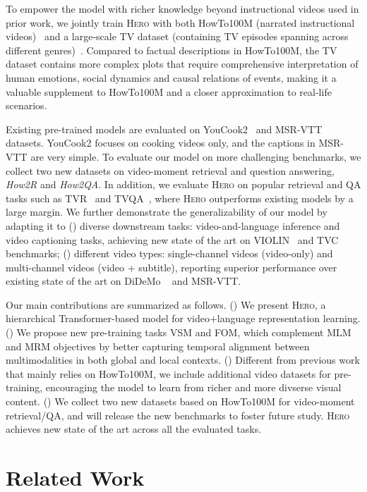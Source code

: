 \documentclass[11pt,a4paper]{article}
\begin{document}
To empower the model with richer knowledge beyond instructional videos used in prior work, we jointly train \textsc{Hero} with both HowTo100M (narrated instructional videos)~\cite{miech2019howto100m} and a large-scale TV dataset (containing TV episodes spanning across different genres)~\cite{lei2018tvqa,lei2019tvqaplus,lei2020tvr,liu2020violin}. Compared to factual descriptions in HowTo100M, the TV dataset contains more complex plots that require comprehensive interpretation of human emotions, social dynamics and causal relations of events, making it a valuable supplement to HowTo100M and a closer approximation to real-life scenarios. 

Existing pre-trained models are evaluated on YouCook2~\citep{zhou2018towards} and MSR-VTT~\citep{xu2016msr} datasets. YouCook2 focuses on cooking videos only, and the captions in MSR-VTT are very simple. To evaluate our model on more challenging benchmarks, we collect two new datasets on video-moment retrieval and question answering, \emph{How2R} and \emph{How2QA}.
In addition, we evaluate \textsc{Hero} on popular retrieval and QA tasks such as TVR~\citep{lei2020tvr} and TVQA~\citep{lei2018tvqa}, where \textsc{Hero} outperforms existing models by a large margin. We further demonstrate the generalizability of our model by adapting it to () diverse downstream tasks: video-and-language inference and video captioning tasks, achieving new state of the art on VIOLIN~\citep{liu2020violin} and  TVC~\citep{lei2020tvr} benchmarks;  () different video types: single-channel videos (video-only) and  multi-channel videos (video + subtitle), reporting superior performance over existing state of the art on DiDeMo ~\citep{didemo} and MSR-VTT. 

Our main contributions are summarized as follows. () We present \textsc{Hero}, a hierarchical Transformer-based model for video+language representation learning. () We propose new pre-training tasks VSM and FOM, which complement MLM and MRM objectives by better capturing temporal alignment between multimodalities in both global and local contexts. () Different from previous work that mainly relies on HowTo100M, we include additional video datasets for pre-training, encouraging the model to learn from richer and more divserse visual content. () We collect two new datasets based on HowTo100M for video-moment retrieval/QA, and will release the new benchmarks to foster future study. \textsc{Hero} achieves new state of the art across all the evaluated tasks. 
 \section{Related Work}
\end{document}
